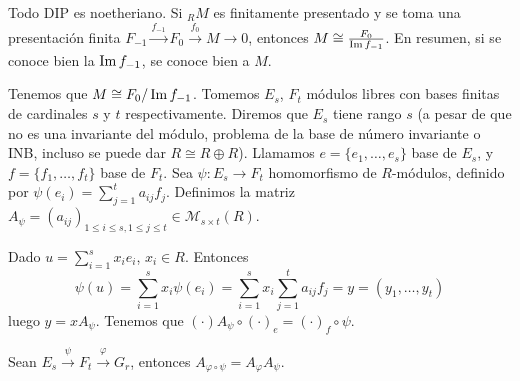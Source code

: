 \begin{ejemplo}
  Todo DIP es noetheriano. Si \({}_RM\) es finitamente presentado y se toma
  una presentación finita \(F_{-1} \overset{f_{-1}}{\longrightarrow} F_0
  \overset{f_0}{\longrightarrow} M \longrightarrow 0\), entonces
  \(M \cong \frac{F_0}{\operatorname{Im} f_{-1}}\). En resumen, si se conoce bien la \(\operatorname{Im} f_{-1}\),
  se conoce bien a \(M\).
\end{ejemplo}

Tenemos que \(M\cong F_0/\operatorname{Im} f_{-1}\). Tomemos \(E_s\), \(F_t\) módulos
libres con bases finitas de cardinales \(s\) y \(t\) respectivamente.
Diremos que \(E_s\) tiene rango \(s\) (a pesar de que no es una invariante
del módulo, problema de la base de número invariante o INB, incluso se
puede dar \(R\cong R\oplus R\)). Llamamos \(e=\{e_1,\ldots,e_s\}\) base
de \(E_s\), y \(f=\{f_1,\ldots,f_t\}\) base de \(F_t\). Sea
\(\psi: E_s\longrightarrow F_t\) homomorfismo de \(R\)-módulos,
definido por \(\psi(e_i)= \sum_{j=1}^t a_{ij}f_j\).
Definimos la matriz \(A_\psi={(a_{ij})}_{1\le i\le s, 1\le j\le t}\in\mathcal{M}_{s\times t}(R)\).

Dado \(u=\sum_{i=1}^s x_i e_i\), \(x_i\in R\). Entonces
\[
  \psi(u)=\sum_{i=1}^s x_i \psi(e_i) = \sum_{i=1}^sx_i \sum_{j=1}^t a_{ij}f_j = y =
  (y_1, \ldots, y_t)
\]
luego \(y = xA_{\psi}\).
Tenemos que \((\cdot)A_\psi\circ{(\cdot)}_e={(\cdot)}_f\circ\psi\).


Sean \(E_s\overset{\psi}{\longrightarrow} F_t\overset{\varphi}{\longrightarrow}
G_r\), entonces \(A_{\varphi\circ\psi}=A_\varphi A_\psi\).

